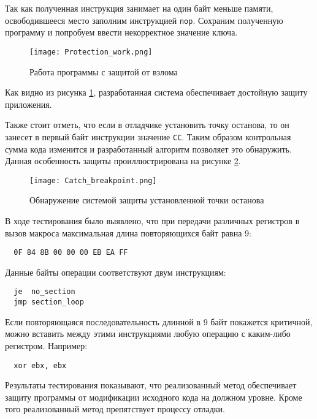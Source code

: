 Так как полученная инструкция занимает на один байт меньше памяти,
освободившееся место заполним инструкцией \verb!nop!. Сохраним полученную
программу и попробуем ввести некорректное значение ключа.

\begin{figure}[hpbt]
  \centering
  \texttt{[image: Protection\_work.png]}
  \caption{Работа программы с защитой от взлома}
  \label{fig:protection_work}
\end{figure}

Как видно из рисунка \ref{fig:protection_work}, разработанная система
обеспечивает достойную защиту приложения.
\newpage

Также стоит отметь, что если в отладчике установить точку останова, то он
занесет в первый байт инструкции значение \verb!CC!. Таким образом контрольная
сумма кода изменится и разработанный алгоритм позволяет это обнаружить. Данная
особенность защиты проиллюстрирована на рисунке \ref{fig:break_poin_catch}.

\begin{figure}[htpb]
  \centering
  \texttt{[image: Catch\_breakpoint.png]}
  \caption{Обнаружение системой защиты установленной точки останова}
  \label{fig:break_poin_catch}
\end{figure}

В ходе тестирования было выявлено, что при передачи различных регистров в
вызов макроса максимальная длина повторяющихся байт равна 9:
\begin{verbatim}
  0F 84 8B 00 00 00 EB EA FF
\end{verbatim}

Данные байты операции соответствуют двум инструкциям:
\begin{verbatim}
  je  no_section
  jmp section_loop
\end{verbatim}

Если повторяющаяся последовательность длинной в 9 байт покажется критичной,
можно вставить между этими инструкциями любую операцию с каким-либо регистром.
Например:
\begin{verbatim}
  xor ebx, ebx
\end{verbatim}

Результаты тестирования показывают, что реализованный метод обеспечивает защиту
программы от модификации исходного кода на должном уровне. Кроме того
реализованный метод препятствует процессу отладки. 
